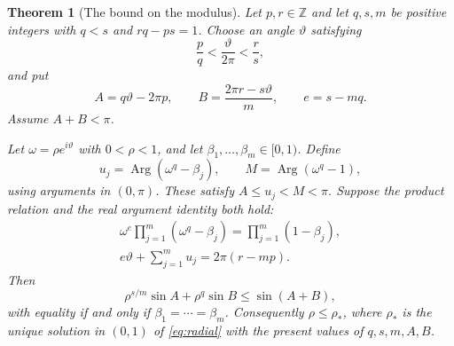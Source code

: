 \documentclass[11pt,a4paper]{article}
\newtheorem{theorem}{Theorem}[section]
\theoremstyle{definition}
\theoremstyle{remark}
\numberwithin{equation}{section}
\begin{document}
\begin{theorem}[The bound on the modulus]\label{thm:convex-product}\label{thm:jensen}
Let $p,r\in\mathbb Z$ and let $q,s,m$ be positive integers with $q<s$ and $rq-ps=1$. Choose an angle $\vartheta$ satisfying
\[
 \frac pq<\frac{\vartheta}{2\pi}<\frac rs,
\]
and put
\[
 A=q\vartheta-2\pi p,\qquad
 B=\frac{2\pi r-s\vartheta}{m},\qquad e=s-mq.
\]
Assume $A+B<\pi$.

Let $\omega=\rho e^{i\vartheta}$ with $0<\rho<1$, and let $\beta_1,\ldots,\beta_m\in[0,1)$. Define
\[
 u_j=\operatorname{Arg}(\omega^q-\beta_j),\qquad
 M=\operatorname{Arg}(\omega^q-1),
\]
using arguments in $(0,\pi)$. These satisfy $A\le u_j<M<\pi$. Suppose the product relation and the real argument identity both hold:
\begin{equation}\label{eq:analytic-product-phase}
 \begin{gathered}
 \omega^e\prod_{j=1}^m(\omega^q-\beta_j)
       =\prod_{j=1}^m(1-\beta_j),\\
 e\vartheta+\sum_{j=1}^m u_j=2\pi(r-mp).
 \end{gathered}
\end{equation}
Then
\begin{equation}\label{eq:sharp-scalar-inequality}
 \rho^{s/m}\sin A+\rho^q\sin B\le\sin(A+B),
\end{equation}
with equality if and only if $\beta_1=\cdots=\beta_m$. Consequently $\rho\le\rho_*$, where $\rho_*$ is the unique solution in $(0,1)$ of \eqref{eq:radial} with the present values of $q,s,m,A,B$.
\end{theorem}
\end{document}

